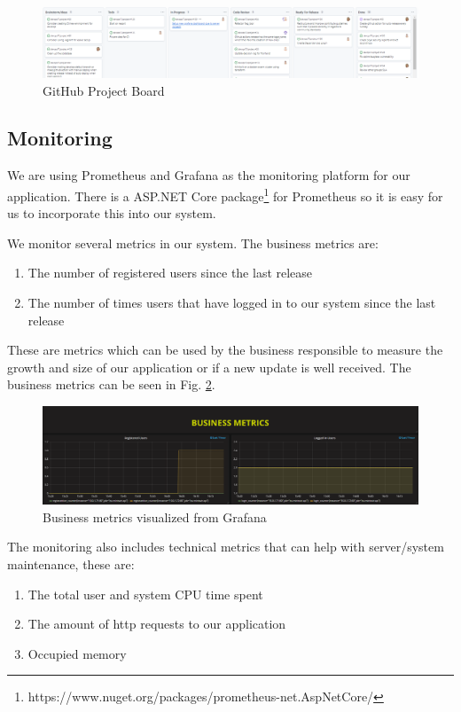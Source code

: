 \documentclass[10pt]{article}
\begin{document}
\begin{figure}[h]
    \centering
    \includegraphics[width=\textwidth]{images/Kanban.PNG}
    \caption{GitHub Project Board}
    \label{fig:Kanban}
\end{figure}

\subsection{Monitoring}
We are using Prometheus and Grafana as the monitoring platform for our application. There is a ASP.NET Core package\footnote{https://www.nuget.org/packages/prometheus-net.AspNetCore/} for Prometheus so it is easy for us to incorporate this into our system.

We monitor several metrics in our system. The business metrics are:
\begin{enumerate}
    \item The number of registered users since the last release
    \item The number of times users that have logged in to our system since the last release 
\end{enumerate}
These are metrics which can be used by the business responsible to measure the growth and size of our application or if a new update is well received. The business metrics can be seen in Fig. \ref{fig:monitoring}. 

\begin{figure}[H]
    \centering
    \includegraphics[width=\textwidth]{images/monitoringbusiness.PNG}
    \caption{Business metrics visualized from Grafana}
    \label{fig:monitoring}
\end{figure}

The monitoring also includes technical metrics that can help with server/system maintenance, these are:
\begin{enumerate}
    \item The total user and system CPU time spent
    \item The amount of http requests to our application
    \item Occupied memory
\end{enumerate}
\end{document}
